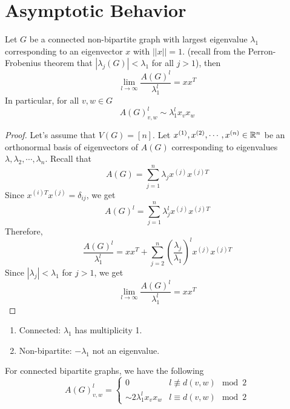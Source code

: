 \section{Asymptotic Behavior}
\begin{theorem}
Let \(G\) be a connected non-bipartite graph with largest eigenvalue \(\lambda_1\) corresponding to an eigenvector \(x\) with \(||x||=1\).
(recall from the Perron-Frobenius theorem that \(|\lambda_j(G)|<\lambda_1\) for all \(j>1\)), then
\[ \lim_{l\to\infty}\frac{A(G)^l}{\lambda_1^l}=xx^T \]
In particular, for all \(v,w\in G\)
\[ A(G)_{v,w}^l\sim \lambda_1^l x_v x_w \]
\end{theorem}
\begin{proof}
Let's assume that \(V(G)=[n]\).
Let \(x^{(1)},x^{(2)},\cdots,x^{(n)}\in\mathbb{R}^n\) be an orthonormal basis of eigenvectors of \(A(G)\) corresponding to eigenvalues \(\lambda,\lambda_2,\cdots,\lambda_n\).
Recall that
\[ A(G)=\sum_{j=1}^{n}\lambda_j x^{(j)} x^{(j)T} \]
Since \(x^{(i)T}x^{(j)}=\delta_{ij}\), we get
\[ A(G)^l=\sum_{j=1}^{n}\lambda_j^l x^{(j)} x^{(j)T} \]
Therefore,
\[ \frac{A(G)^l}{\lambda_1^l}=xx^T+\sum_{j=2}^{n}\left(\frac{\lambda_j}{\lambda_1}\right)^lx^{(j)} x^{(j)T} \]
Since \(|\lambda_j|<\lambda_1\) for \(j>1\), we get
\[ \lim_{l\to\infty}\frac{A(G)^l}{\lambda_1^l}=xx^T \]
\end{proof}
\begin{remark}
\begin{enumerate}
\item Connected: \(\lambda_1\) has multiplicity 1.
\item Non-bipartite: \(-\lambda_1\) not an eigenvalue.
\end{enumerate}
For connected bipartite graphs, we have the following
\[ A(G)^l_{v,w}=\begin{cases}0 & l\not\equiv d(v,w) \mod 2 \\ \sim 2\lambda_1^l x_v x_w & l\equiv d(v,w) \mod 2  \end{cases} \]
\end{remark}

